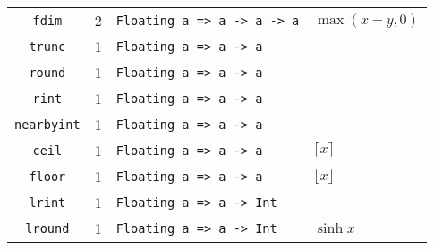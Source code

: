 \begin{longtable}[c]{ccll}
  \texttt{fdim} & 2 & \texttt{Floating a => a -> a -> a} & $\max(x-y, 0)$\\
  \texttt{trunc} & 1 & \texttt{Floating a => a -> a} & \\
  \texttt{round} & 1 & \texttt{Floating a => a -> a} & \\
  \texttt{rint} & 1 & \texttt{Floating a => a -> a} & \\
  \texttt{nearbyint} & 1 & \texttt{Floating a => a -> a} & \\
  \texttt{ceil} & 1 & \texttt{Floating a => a -> a} & $\lceil x \rceil$\\
  \texttt{floor} & 1 & \texttt{Floating a => a -> a} & $\lfloor x \rfloor$\\
  \texttt{lrint} & 1 & \texttt{Floating a => a -> Int} & \\
  \texttt{lround} & 1 & \texttt{Floating a => a -> Int} & $\sinh x$\\
  \bottomrule[1.5pt]
\end{longtable}

